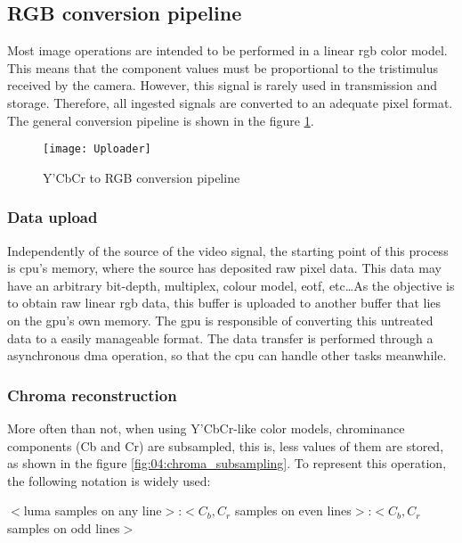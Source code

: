 \documentclass[../main.tex]{subfiles}
\begin{document}
\subsection{RGB conversion pipeline}

Most image operations are intended to be performed in a linear \gls{rgb} color model. This means that the component values must be proportional to the tristimulus received by the camera. However, this signal is rarely used in transmission and storage. Therefore, all ingested signals are converted to an adequate \gls{pixel} format. The general conversion pipeline is shown in the figure \ref{fig:04:uploader}.\newline

\begin{figure}[htbp]
    \centering
    \texttt{[image: Uploader]}

    \caption{Y'CbCr to RGB conversion pipeline}
    \label{fig:04:uploader}
\end{figure}

\subsubsection{Data upload}
Independently of the source of the video signal, the starting point of this process is \gls{cpu}'s memory, where the source has deposited raw \gls{pixel} data. This data may have an arbitrary bit-depth, multiplex, colour model, \gls{eotf}, etc\dots As the objective is to obtain raw linear \gls{rgb} data, this buffer is uploaded to another buffer that lies on the \gls{gpu}'s own memory. The \gls{gpu} is responsible of converting this untreated data to a easily manageable format. The data transfer is performed through a asynchronous \gls{dma} operation, so that the \gls{cpu} can handle other tasks meanwhile.


\subsubsection{Chroma reconstruction}
More often than not, when using Y'CbCr-like color models, chrominance components (Cb and Cr) are subsampled, this is, less values of them are stored, as shown in the figure \ref{fig:04:chroma_subsampling}. To represent this operation, the following notation is widely used: 

\begin{center}
    $<$luma samples on any line$>$:$<C_b, C_r$ samples on even lines$>$:$<C_b, C_r$ samples on odd lines$>$
\end{center}
\end{document}
